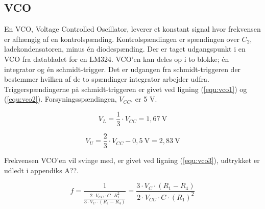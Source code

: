 \subsection*{VCO}
\label{volumenkontrol-design-vco}

En VCO, Voltage Controlled Oscillator, leverer et konstant signal hvor frekvensen er afhængig af en kontrolspænding. Kontrolspændingen er spændingen over $C_2$, ladekondensatoren, minus én diodespænding. Der er taget udgangspunkt i en VCO fra databladet for en LM324. VCO'en kan deles op i to blokke; én integrator og én schmidt-trigger. Det er udgangen fra schmidt-triggeren der bestemmer hvilken af de to spændinger integrator arbejder udfra. Triggerspændingerne på schmidt-triggeren er givet ved ligning (\ref{equ:vco1}) og (\ref{equ:vco2}). Forsyningsspændingen, $V_{CC}$, er 5 V.

\begin{equation}
\label{equ:vco1}
V_L = \frac{1}{3} \cdot V_{CC} = 1,67~\mathrm{V}
\end{equation}

\begin{equation}
\label{equ:vco2}
V_U = \frac{2}{3} \cdot V_{CC} - 0,5~\mathrm{V} = 2,83~\mathrm{V}
\end{equation}

Frekvensen VCO'en vil svinge med, er givet ved ligning (\ref{equ:vco3}), udtrykket er udledt i appendiks A??.

\begin{equation}
\label{equ:vco3}
f = \frac{1}{\frac{2 \cdot V_{CC} \cdot C \cdot R_1^2}{3 \cdot V_C \cdot (R_1 - R_4)}} = \frac{3 \cdot V_C \cdot (R_1 - R_4)}{2 \cdot V_{CC} \cdot C \cdot (R_1)^2}
\end{equation}

